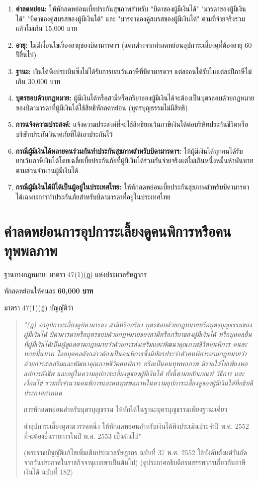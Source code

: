 \documentclass[12pt,a4paper]{article}
\newcommand{\hilight}[1]{\textbf{#1}}
\begin{document}
\begin{enumerate}
    \item \textbf{ค่าลดหย่อน:} ให้หักลดหย่อนเบี้ยประกันสุขภาพสำหรับ "บิดาของผู้มีเงินได้" "มารดาของผู้มีเงินได้" "บิดาของคู่สมรสของผู้มีเงินได้" และ "มารดาของคู่สมรสของผู้มีเงินได้" ตามที่จ่ายจริงรวมแล้วไม่เกิน 15,000 บาท
    \item \textbf{อายุ:} ไม่มีเงื่อนไขเรื่องอายุของบิดามารดาฯ (แตกต่างจากค่าลดหย่อนอุปการะเลี้ยงดูที่ต้องอายุ 60 ปีขึ้นไป)
    \item \textbf{ฐานะ:} เงินได้พึงประเมินซึ่งไม่ได้รับการยกเว้นภาษีที่บิดามารดาฯ แต่ละคนได้รับในแต่ละปีภาษีไม่เกิน 30,000 บาท
    \item \textbf{บุตรชอบด้วยกฎหมาย:} ผู้มีเงินได้หรือสามีหรือภริยาของผู้มีเงินได้จะต้องเป็นบุตรชอบด้วยกฎหมายของบิดามารดาที่ผู้มีเงินได้ใช้สิทธิหักลดหย่อน (บุตรบุญธรรมไม่มีสิทธิ)
    \item \textbf{การแจ้งความประสงค์:} แจ้งความประสงค์ที่จะใช้สิทธิยกเว้นภาษีเงินได้ต่อบริษัทประกันชีวิตหรือบริษัทประกันวินาศภัยที่ได้เอาประกันไว้
    \item \textbf{กรณีผู้มีเงินได้หลายคนร่วมกันทำประกันสุขภาพสำหรับบิดามารดาฯ:} ให้ผู้มีเงินได้ทุกคนได้รับยกเว้นภาษีเงินได้โดยเฉลี่ยเบี้ยประกันภัยที่ผู้มีเงินได้ร่วมกันจ่ายจริงแต่ไม่เกินหนึ่งหมื่นห้าพันบาท ตามส่วนจำนวนผู้มีเงินได้
    \item \textbf{กรณีผู้มีเงินได้มิได้เป็นผู้อยู่ในประเทศไทย:} ให้หักลดหย่อนเบี้ยประกันสุขภาพสำหรับบิดามารดาได้เฉพาะการทำประกันภัยสำหรับบิดามารดาที่อยู่ในประเทศไทย
\end{enumerate}

\newpage
\section{ค่าลดหย่อนการอุปการะเลี้ยงดูคนพิการหรือคนทุพพลภาพ}

ฐานทางกฎหมาย: มาตรา 47(1)(ฎ) แห่งประมวลรัษฎากร

หักลดหย่อนให้คนละ \hilight{60,000 บาท}

มาตรา 47(1)(ฎ) บัญญัติว่า

\begin{quote}
{\itshape "(ฎ) ค่าอุปการะเลี้ยงดูบิดามารดา สามีหรือภริยา บุตรชอบด้วยกฎหมายหรือบุตรบุญธรรมของผู้มีเงินได้ บิดามารดาหรือบุตรชอบด้วยกฎหมายของสามีหรือภริยาของผู้มีเงินได้ หรือบุคคลอื่นที่ผู้มีเงินได้เป็นผู้ดูแลตามกฎหมายว่าด้วยการส่งเสริมและพัฒนาคุณภาพชีวิตคนพิการ คนละหกหมื่นบาท โดยบุคคลดังกล่าวต้องเป็นคนพิการซึ่งมีบัตรประจำตัวคนพิการตามกฎหมายว่าด้วยการส่งเสริมและพัฒนาคุณภาพชีวิตคนพิการ หรือเป็นคนทุพพลภาพ มีรายได้ไม่เพียงพอแก่การยังชีพ และอยู่ในความอุปการะเลี้ยงดูของผู้มีเงินได้ ทั้งนี้ตามหลักเกณฑ์ วิธีการ และเงื่อนไข รวมทั้งจำนวนคนพิการและคนทุพพลภาพในความอุปการะเลี้ยงดูของผู้มีเงินได้ที่อธิบดีประกาศกำหนด

การหักลดหย่อนสำหรับบุตรบุญธรรม ให้หักได้ในฐานะบุตรบุญธรรมเพียงฐานะเดียว

ค่าอุปการะเลี้ยงดูตามวรรคหนึ่ง ให้หักลดหย่อนสำหรับเงินได้พึงประเมินประจำปี พ.ศ. 2552 ที่จะต้องยื่นรายการในปี พ.ศ. 2553 เป็นต้นไป"} (พระราชบัญญัติแก้ไขเพิ่มเติมประมวลรัษฎากร ฉบับที่ 37 พ.ศ. 2552 ใช้บังคับตั้งแต่วันถัดจากวันประกาศในราชกิจจานุเบกษาเป็นต้นไป) (ดูประกาศอธิบดีกรมสรรพากรเกี่ยวกับภาษีเงินได้ ฉบับที่ 182)
\end{quote}
\end{document}
